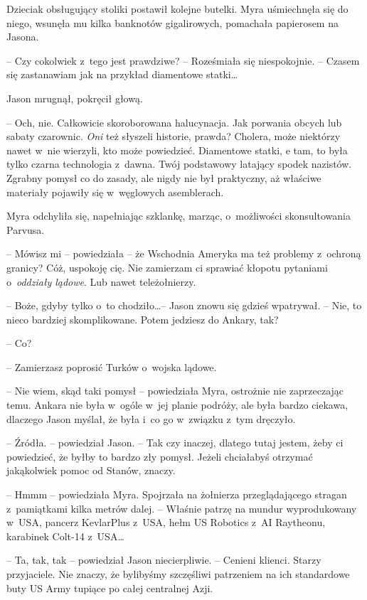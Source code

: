 \documentclass[oneside,polish,11pt,sfheadings]{mwbk}
\begin{document}
Dzieciak obsługujący stoliki postawił kolejne butelki. Myra uśmiechnęła
się do niego, wsunęła mu kilka banknotów gigalirowych, pomachała
papierosem na Jasona.

-- Czy cokolwiek z~tego jest prawdziwe? -- Roześmiała się niespokojnie. -- Czasem się zastanawiam jak na przykład diamentowe statki\ldots

Jason mrugnął, pokręcił głową. 

-- Och, nie. Całkowicie skoroborowana
halucynacja. Jak porwania obcych lub sabaty czarownic. \textit{Oni} też
słyszeli historie, prawda? Cholera, może niektórzy nawet w~nie wierzyli,
kto może powiedzieć. Diamentowe statki, e tam, to była tylko czarna
technologia z~dawna. Twój podstawowy latający spodek nazistów. Zgrabny
pomysł co do zasady, ale nigdy nie był praktyczny, aż właściwe materiały
pojawiły się w~węglowych asemblerach.

Myra odchyliła się, napełniając szklankę, marząc, o~możliwości
skonsultowania Parvusa. 

-- Mówisz mi -- powiedziała -- że Wschodnia Ameryka
ma też problemy z~ochroną granicy? Cóż, uspokoję cię. Nie zamierzam ci
sprawiać kłopotu pytaniami o~\textit{oddziały lądowe}. Lub nawet
teleżołnierzy.

-- Boże, gdyby tylko o~to chodziło\ldots -- Jason znowu się gdzieś wpatrywał.
-- Nie, to nieco bardziej skomplikowane. Potem jedziesz do Ankary, tak?

-- Co?

-- Zamierzasz poprosić Turków o~wojska lądowe.

-- Nie wiem, skąd taki pomysł -- powiedziała Myra, ostrożnie nie
zaprzeczając temu. Ankara nie była w~ogóle w~jej planie podróży, ale
była bardzo ciekawa, dlaczego Jason myślał, że była i~co go w~związku z~tym dręczyło.

-- Źródła. -- powiedział Jason. -- Tak czy inaczej, dlatego tutaj jestem,
żeby ci powiedzieć, że byłby to bardzo zły pomysł. Jeżeli chciałabyś
otrzymać jakąkolwiek pomoc od Stanów, znaczy.

-- Hmmm -- powiedziała Myra. Spojrzała na żołnierza przeglądającego
stragan z~pamiątkami kilka metrów dalej. -- Właśnie patrzę na mundur
wyprodukowany w~USA, pancerz KevlarPlus z~USA, hełm US Robotics z~AI
Raytheonu, karabinek Colt-14 z~USA\ldots

-- Ta, tak, tak -- powiedział Jason niecierpliwie. -- Cenieni klienci.
Starzy przyjaciele. Nie znaczy, że bylibyśmy szczęśliwi patrzeniem na
ich standardowe buty US Army tupiące po całej centralnej Azji.
\end{document}
